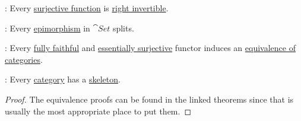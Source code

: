 \begin{theorem}
\begin{thmenum}[resume=thm:axiom_of_choice_equivalences]
     : Every \hyperref[def:function_invertibility/surjective]{surjective function} is \hyperref[def:morphism_invertibility/right]{right invertible}.

     : Every \hyperref[def:morphism_cancellation/right]{epimorphism} in \hyperref[def:category_of_small_sets]{\( \cat{Set} \)} splits.

     : Every \hyperref[def:functor_invertibility/fully_faithful]{fully faithful} and \hyperref[def:functor_invertibility/essentially_surjective]{essentially surjective} functor induces an \hyperref[def:equivalence_of_categories]{equivalence of categories}.

     : Every \hyperref[def:category]{category} has a \hyperref[def:skeletal_category]{skeleton}.
  \end{thmenum}
\end{theorem}
\begin{proof}
  The equivalence proofs can be found in the linked theorems since that is usually the most appropriate place to put them.
\end{proof}

